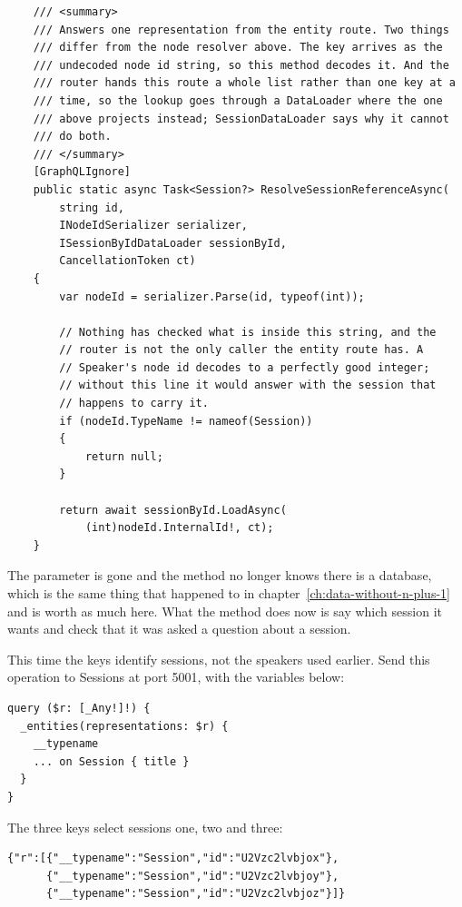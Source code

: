 \begin{verbatim}
    /// <summary>
    /// Answers one representation from the entity route. Two things
    /// differ from the node resolver above. The key arrives as the
    /// undecoded node id string, so this method decodes it. And the
    /// router hands this route a whole list rather than one key at a
    /// time, so the lookup goes through a DataLoader where the one
    /// above projects instead; SessionDataLoader says why it cannot
    /// do both.
    /// </summary>
    [GraphQLIgnore]
    public static async Task<Session?> ResolveSessionReferenceAsync(
        string id,
        INodeIdSerializer serializer,
        ISessionByIdDataLoader sessionById,
        CancellationToken ct)
    {
        var nodeId = serializer.Parse(id, typeof(int));

        // Nothing has checked what is inside this string, and the
        // router is not the only caller the entity route has. A
        // Speaker's node id decodes to a perfectly good integer;
        // without this line it would answer with the session that
        // happens to carry it.
        if (nodeId.TypeName != nameof(Session))
        {
            return null;
        }

        return await sessionById.LoadAsync(
            (int)nodeId.InternalId!, ct);
    }
\end{verbatim}

%
The  parameter is gone and the method no longer knows
there is a database, which is the same thing that happened to
 in
chapter~\ref{ch:data-without-n-plus-1} and is worth as much here. What the
method does now is say which session it wants and check that it was asked a
question about a session.

%
This time the keys identify sessions, not the speakers used earlier. Send
this operation to Sessions at port 5001, with the variables below:

\begin{verbatim}
query ($r: [_Any!]!) {
  _entities(representations: $r) {
    __typename
    ... on Session { title }
  }
}
\end{verbatim}

The three keys select sessions one, two and three:

\begin{verbatim}
{"r":[{"__typename":"Session","id":"U2Vzc2lvbjox"},
      {"__typename":"Session","id":"U2Vzc2lvbjoy"},
      {"__typename":"Session","id":"U2Vzc2lvbjoz"}]}
\end{verbatim}

